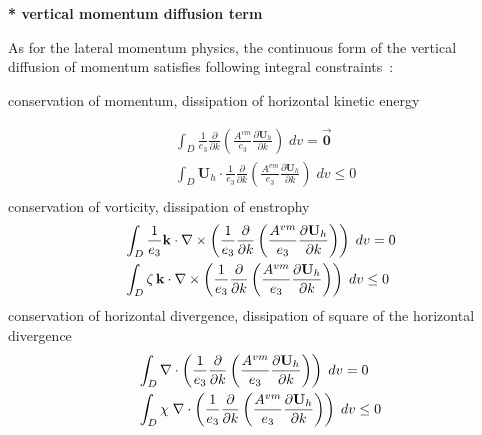 \documentclass[../tex_main/NEMO_manual]{subfiles}
\begin{document}
\textbf{* vertical momentum diffusion term}

As for the lateral momentum physics, the continuous form of the vertical diffusion of
momentum satisfies following integral constraints~:

conservation of momentum, dissipation of horizontal kinetic energy

\begin{equation} \label{eq:dynzdf_dyn}
\begin{aligned}
& \int_D {\frac{1}{e_3 }}  \frac{\partial }{\partial k}\left( \frac{A^{vm}}{e_3 }\frac{\partial {\textbf{U}}_h }{\partial k} \right) \;dv = \overrightarrow{\textbf{0}} \\ 
& \int_D \textbf{U}_h \cdot \frac{1}{e_3} \frac{\partial}{\partial k} \left( {\frac{A^{vm}}{e_3 }}{\frac{\partial \textbf{U}_h }{\partial k}} \right) \;dv \leq 0 \\ 
 \end{aligned} 
 \end{equation}
conservation of vorticity, dissipation of enstrophy
\begin{equation} \label{eq:dynzdf_vor}
\begin{aligned}
& \int_D {\frac{1}{e_3 }{\rm {\bf k}}\cdot \nabla \times \left( {\frac{1}{e_3 
}\frac{\partial }{\partial k}\left( {\frac{A^{vm}}{e_3 }\frac{\partial {\rm 
{\bf U}}_h }{\partial k}} \right)} \right)\;dv} =0 \\ 
& \int_D {\zeta \,{\rm {\bf k}}\cdot \nabla \times \left( {\frac{1}{e_3 
}\frac{\partial }{\partial k}\left( {\frac{A^{vm}}{e_3 }\frac{\partial {\rm 
{\bf U}}_h }{\partial k}} \right)} \right)\;dv} \leq 0 \\ 
\end{aligned}
\end{equation}
conservation of horizontal divergence, dissipation of square of the horizontal divergence
\begin{equation} \label{eq:dynzdf_div}
\begin{aligned}
 &\int_D {\nabla \cdot \left( {\frac{1}{e_3 }\frac{\partial }{\partial 
k}\left( {\frac{A^{vm}}{e_3 }\frac{\partial {\rm {\bf U}}_h }{\partial k}} 
\right)} \right)\;dv} =0 \\ 
& \int_D {\chi \;\nabla \cdot \left( {\frac{1}{e_3 }\frac{\partial }{\partial 
k}\left( {\frac{A^{vm}}{e_3 }\frac{\partial {\rm {\bf U}}_h }{\partial k}} 
\right)} \right)\;dv} \leq 0 \\ 
\end{aligned}
\end{equation}
\end{document}
